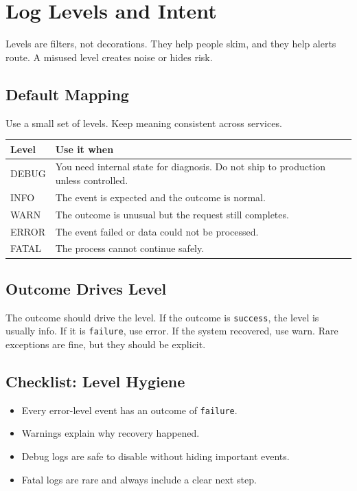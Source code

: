 \chapter{Log Levels and Intent}
Levels are filters, not decorations. They help people skim, and they help alerts route. A misused level creates noise or hides risk.

\section{Default Mapping}
Use a small set of levels. Keep meaning consistent across services.

\begin{table}[h]
\centering
\begin{tabularx}{\textwidth}{lX}
\toprule
Level & Use it when \\
\midrule
DEBUG & You need internal state for diagnosis. Do not ship to production unless controlled. \\
INFO & The event is expected and the outcome is normal. \\
WARN & The outcome is unusual but the request still completes. \\
ERROR & The event failed or data could not be processed. \\
FATAL & The process cannot continue safely. \\
\bottomrule
\end{tabularx}
\end{table}

\section{Outcome Drives Level}
The outcome should drive the level. If the outcome is \texttt{success}, the level is usually info. If it is \texttt{failure}, use error. If the system recovered, use warn. Rare exceptions are fine, but they should be explicit.

\section{Checklist: Level Hygiene}
\begin{itemize}
\item Every error-level event has an outcome of \texttt{failure}.
\item Warnings explain why recovery happened.
\item Debug logs are safe to disable without hiding important events.
\item Fatal logs are rare and always include a clear next step.
\end{itemize}

